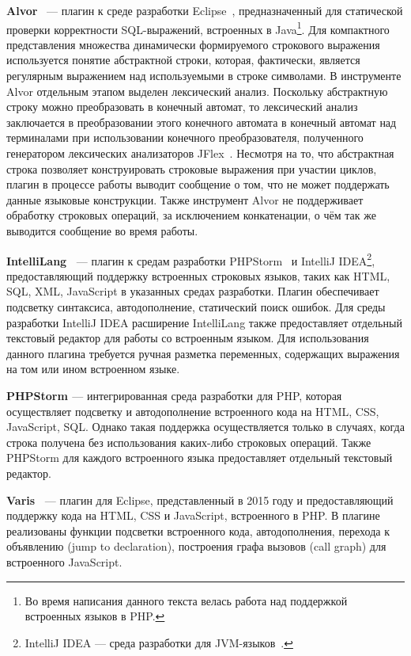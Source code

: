 \textbf{Alvor}~\cite{Alvor1, Alvor2, AlvorUrl} {---} плагин к среде разработки Eclipse~\cite{Eclipse}, предназначенный для статической проверки корректности SQL-выражений, встроенных в Java\footnote{Во время написания данного текста велась работа над поддержкой встроенных языков в PHP.}. Для компактного представления множества динамически формируемого строкового выражения используется понятие абстрактной строки, которая, фактически, является регулярным выражением над используемыми в строке символами. В инструменте Alvor отдельным этапом выделен лексический анализ. Поскольку абстрактную строку можно преобразовать в конечный автомат, то лексический анализ заключается в преобразовании этого конечного автомата в конечный автомат над терминалами при  использовании конечного преобразователя, полученного генератором лексических анализаторов JFlex~\cite{JFlex}. Несмотря на то, что абстрактная строка позволяет конструировать строковые выражения при участии циклов, плагин в процессе работы выводит сообщение  о том, что не может поддержать данные языковые конструкции. Также инструмент Alvor не поддерживает обработку строковых операций, за исключением конкатенации, о чём так же выводится сообщение во время работы.

\textbf{IntelliLang~\cite{IntelliLang}} --- плагин к средам разработки PHPStorm~\cite{PHPStorm} и IntelliJ IDEA\footnote{IntelliJ IDEA --- среда разработки для JVM-языков~\cite{IDEA}.}, предоставляющий поддержку встроенных строковых языков, таких как HTML, SQL, XML, JavaScript в указанных средах разработки. Плагин обеспечивает подсветку синтаксиса, автодополнение, статический поиск ошибок. Для среды разработки IntelliJ IDEA расширение IntelliLang также предоставляет отдельный текстовый редактор для работы со встроенным языком. Для использования данного плагина требуется ручная разметка переменных, содержащих выражения на том или ином встроенном языке.
    
\textbf{PHPStorm \cite{PHPStorm}} --- интегрированная среда разработки для PHP, которая осуществляет подсветку и автодополнение встроенного кода на HTML, CSS, JavaScript, SQL. Однако такая поддержка осуществляется только в случаях, когда строка получена без использования каких-либо строковых операций. Также PHPStorm для каждого встроенного языка предоставляет отдельный текстовый редактор. 

\textbf{Varis~\cite{Varis}} ---  плагин для Eclipse, представленный в 2015 году и предоставляющий поддержку кода на HTML, CSS и JavaScript, встроенного в PHP. В плагине реализованы функции  подсветки встроенного кода, автодополнения, перехода к объявлению (jump to declaration), построения графа вызовов (call graph) для встроенного JavaScript.

